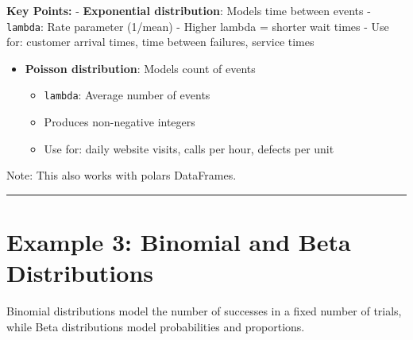 \documentclass[
  letterpaper,
]{scrbook}
\providecommand{\tightlist}{%
  \setlength{\itemsep}{0pt}\setlength{\parskip}{0pt}}
\begin{document}
\textbf{Key Points:} - \textbf{Exponential distribution}: Models time
between events - \texttt{lambda}: Rate parameter (1/mean) - Higher
lambda = shorter wait times - Use for: customer arrival times, time
between failures, service times

\begin{itemize}
\tightlist
\item
  \textbf{Poisson distribution}: Models count of events

  \begin{itemize}
  \tightlist
  \item
    \texttt{lambda}: Average number of events
  \item
    Produces non-negative integers
  \item
    Use for: daily website visits, calls per hour, defects per unit
  \end{itemize}
\end{itemize}

Note: This also works with polars DataFrames.

\begin{center}\rule{0.5\linewidth}{0.5pt}\end{center}

\section{Example 3: Binomial and Beta
Distributions}\label{example-3-binomial-and-beta-distributions}

Binomial distributions model the number of successes in a fixed number
of trials, while Beta distributions model probabilities and proportions.
\end{document}
